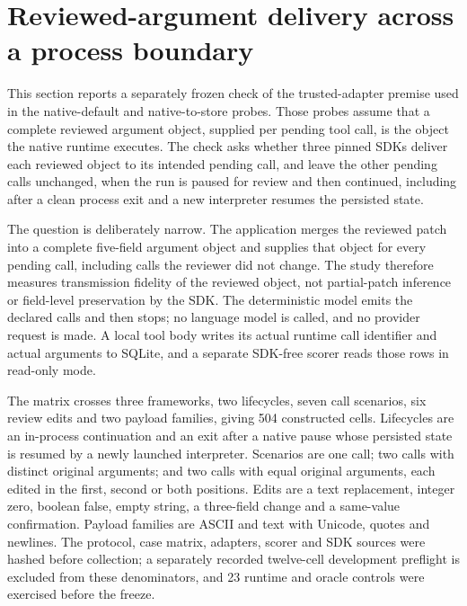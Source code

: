 \section{Reviewed-argument delivery across a process boundary}
\label{sec:a17-correction-consumption}

This section reports a separately frozen check of the trusted-adapter premise used in
the native-default and native-to-store probes. Those probes assume that a complete
reviewed argument object, supplied per pending tool call, is the object the native
runtime executes. The check asks whether three pinned SDKs deliver each reviewed
object to its intended pending call, and leave the other pending calls unchanged,
when the run is paused for review and then continued, including after a clean process
exit and a new interpreter resumes the persisted state.

The question is deliberately narrow. The application merges the reviewed patch into a
complete five-field argument object and supplies that object for every pending call,
including calls the reviewer did not change. The study therefore measures
transmission fidelity of the reviewed object, not partial-patch inference or
field-level preservation by the SDK. The deterministic model emits the declared calls
and then stops; no language model is called, and no provider request is made. A local
tool body writes its actual runtime call identifier and actual arguments to SQLite,
and a separate SDK-free scorer reads those rows in read-only mode.

The matrix crosses three frameworks, two lifecycles, seven call scenarios, six review
edits and two payload families, giving 504 constructed cells. Lifecycles are an
in-process continuation and an exit after a native pause whose persisted state is
resumed by a newly launched interpreter. Scenarios are one call; two calls with
distinct original arguments; and two calls with equal original arguments, each edited
in the first, second or both positions. Edits are a text replacement, integer zero,
boolean false, empty string, a three-field change and a same-value confirmation.
Payload families are ASCII and text with Unicode, quotes and newlines. The protocol,
case matrix, adapters, scorer and SDK sources were hashed before collection; a
separately recorded twelve-cell development preflight is excluded from these
denominators, and 23 runtime and oracle controls were exercised before the freeze.

